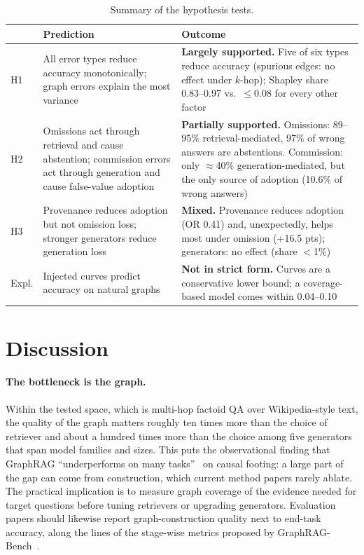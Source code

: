 \documentclass[11pt]{article}
\newcommand{\khop}{$k$-hop\xspace}
\begin{document}
\begin{table}[t]
\caption{Summary of the hypothesis tests.}\label{tab:hyp}
\small
\begin{tabular}{p{0.9cm}p{5.6cm}p{6.3cm}}
\toprule
& Prediction & Outcome \\
\midrule
H1 & All error types reduce accuracy monotonically; graph errors explain the most variance & \textbf{Largely supported.} Five of six types reduce accuracy (spurious edges: no effect under \khop); Shapley share 0.83--0.97 vs.\ $\le$0.08 for every other factor \\
H2 & Omissions act through retrieval and cause abstention; commission errors act through generation and cause false-value adoption & \textbf{Partially supported.} Omissions: 89--95\% retrieval-mediated, 97\% of wrong answers are abstentions. Commission: only $\approx$40\% generation-mediated, but the only source of adoption (10.6\% of wrong answers) \\
H3 & Provenance reduces adoption but not omission loss; stronger generators reduce generation loss & \textbf{Mixed.} Provenance reduces adoption (OR 0.41) and, unexpectedly, helps most under omission (+16.5 pts); generators: no effect (share $<$1\%) \\
Expl. & Injected curves predict accuracy on natural graphs & \textbf{Not in strict form.} Curves are a conservative lower bound; a coverage-based model comes within 0.04--0.10 \\
\bottomrule
\end{tabular}
\end{table}

\section{Discussion}\label{sec:discussion}
\paragraph{The bottleneck is the graph.} Within the tested space, which is multi-hop factoid QA over Wikipedia-style text, the quality of the graph matters roughly ten times more than the choice of retriever and about a hundred times more than the choice among five generators that span model families and sizes. This puts the observational finding that GraphRAG ``underperforms on many tasks''~\cite{han2026ragvs,xiang2025when} on causal footing: a large part of the gap can come from construction, which current method papers rarely ablate. The practical implication is to measure graph coverage of the evidence needed for target questions before tuning retrievers or upgrading generators. Evaluation papers should likewise report graph-construction quality next to end-task accuracy, along the lines of the stage-wise metrics proposed by GraphRAG-Bench~\cite{xiang2025when}.
\end{document}

